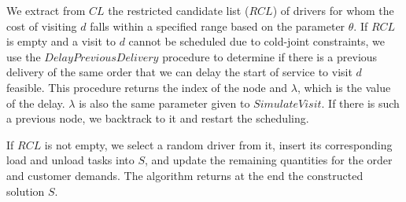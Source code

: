 \documentclass{article}
\begin{document}
We extract from $CL$ the restricted candidate list ($RCL$) of drivers for whom the cost of visiting $d$ falls within a specified range based on the parameter $\theta$. If $RCL$ is empty and a visit to $d$ cannot be scheduled due to cold-joint constraints, we use the $DelayPreviousDelivery$ procedure to determine if there is a previous delivery of the same order that we can delay the start of service to visit $d$ feasible. This procedure returns the index of the node and $\lambda$, which is the value of the delay. $\lambda$ is also the same parameter given to $SimulateVisit$. If there is such a previous node, we backtrack to it and restart the scheduling.

If $RCL$ is not empty, we select a random driver from it, insert its corresponding load and unload tasks into $S$, and update the remaining quantities for the order and customer demands. The algorithm returns at the end the constructed solution $S$.
\end{document}
